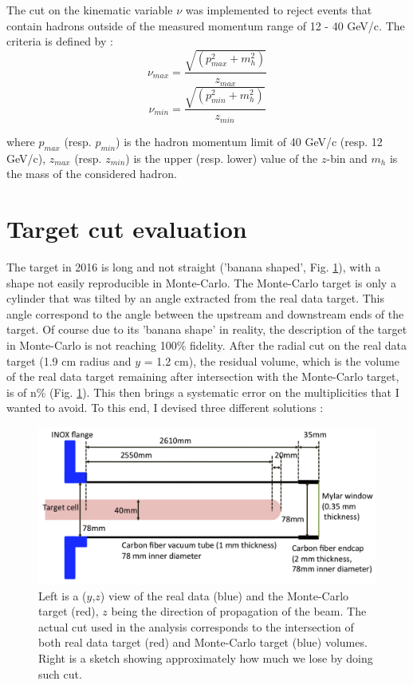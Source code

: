 The cut on the kinematic variable $\nu$ was implemented to reject events that contain hadrons outside of the measured
momentum range of 12 - 40 GeV/c. The criteria is defined by :
\begin{equation}
  \nu_{max} = \frac{\sqrt{(p^2_{max}+m^2_h)}}{z_{max}}
\end{equation}
\begin{equation}
  \nu_{min} = \frac{\sqrt{(p^2_{min}+m^2_h)}}{z_{min}}
\end{equation}

where $p_{max}$ (resp. $p_{min}$) is the hadron momentum limit of 40 GeV/c (resp. 12 GeV/c), $z_{max}$ (resp. $z_{min}$)
is the upper (resp. lower) value of the $z$-bin and $m_h$ is the mass of the considered hadron.


\section{Target cut evaluation}

The target in 2016 is long and not straight ('banana shaped', Fig. \ref{}), with a shape not easily reproducible in Monte-Carlo. The Monte-Carlo target is only a cylinder that was tilted by an angle extracted from the real data target. This angle correspond to the angle between the upstream and downstream ends of the target. Of course due to its 'banana shape' in reality, the description of the target in Monte-Carlo is not reaching 100\% fidelity. After the radial cut on the real data target (1.9 cm radius and $y$ = 1.2 cm), the residual volume, which is the volume of the real data target remaining after intersection with the Monte-Carlo target, is of n\% (Fig. \ref{pic:Target}). This then brings a systematic error on the multiplicities that I wanted to avoid. To this end, I devised three different solutions :

\begin{figure}[!h]
	\includegraphics[scale=0.4]{./gfx/Target.png}
	\caption{Left is a ($y$,$z$) view of the real data (blue) and the Monte-Carlo target (red), $z$ being the direction of propagation of the beam. The actual cut used in the analysis corresponds to the intersection of both real data target (red) and Monte-Carlo target (blue) volumes. Right is a sketch showing approximately how much we lose by doing such cut.}
	\label{pic:Target}
\end{figure}

